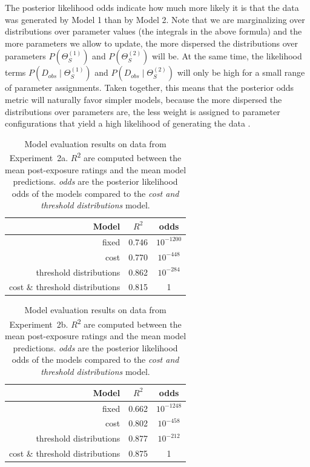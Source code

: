 \documentclass[man, floatsintext]{apa6}
\begin{document}
\noindent The posterior likelihood odds indicate how much more likely it is that the data was generated by Model 1 than by Model 2. Note that we are marginalizing over distributions over parameter values (the integrals in the above formula) and the more parameters we allow to update, the more dispersed the distributions over parameters  $P\left(\Theta_{S}^{(1)}\right)$ and $P\left(\Theta_{S}^{(2)}\right)$ will be. At the same time, the likelihood terms $P\left(D_{obs} \mid \Theta_{S}^{(1)}\right)$ and $P\left(D_{obs} \mid \Theta_{S}^{(2)}\right)$ will only be high for a small range of parameter assignments. Taken together, this means that the posterior odds metric will naturally favor simpler models, because the more dispersed the distributions over parameters are, the less weight is assigned to parameter configurations that yield a high likelihood of generating the data \parencite[a property often referred to as Bayesian Occam's razor; see, e.g., ][]{MacKay1992,Neal1995}. 
\begin{table}
\center
\begin{tabular}{r | c | c  }
Model & $R^2$ &   odds  \\ \midrule
fixed & 0.746 & $10^{-1200}$    \\
cost & 0.770 &  $10^{-448}$    \\
threshold distributions & 0.862 &  $10^{-284}$   \\
cost \& threshold distributions & 0.815 & 1 \\
\end{tabular}
\caption{Model evaluation results on data from Experiment~2a. $R$\textsuperscript{$2$} are computed between  the mean post-exposure ratings and the mean model predictions. \textit{odds} are the posterior likelihood odds of the models compared to the \textit{cost and threshold distributions} model. \label{tbl:model-comparison}}
\end{table}

\begin{table}
\center
\begin{tabular}{r | c | c }
Model & $R^2$ &   odds  \\ \midrule
fixed & 0.662 & $10^{-1248}$    \\
cost & 0.802 &  $10^{-458}$  \\
threshold distributions & 0.877 & $10^{-212}$  \\
cost \& threshold distributions & 0.875 & 1 \\
\end{tabular}
\caption{Model evaluation results on data from Experiment~2b.  $R$\textsuperscript{$2$} are computed between  the mean post-exposure ratings and the mean model predictions. \textit{odds} are the posterior likelihood odds of the models compared to the \textit{cost and threshold distributions} model.  \label{tbl:model-comparison-replication}}
\end{table}
\end{document}
